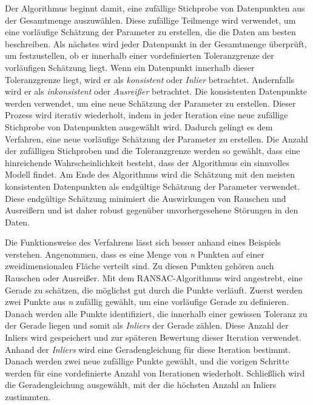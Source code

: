 Der Algorithmus beginnt damit, eine zufällige Stichprobe von Datenpunkten aus der Gesamtmenge auszuwählen. Diese zufällige Teilmenge wird verwendet, um eine vorläufige Schätzung der Parameter zu erstellen, die die Daten am besten beschreiben. Als nächstes wird jeder Datenpunkt in der Gesamtmenge überprüft, um festzustellen, ob er innerhalb einer vordefinierten Toleranzgrenze der vorläufigen Schätzung liegt. Wenn ein Datenpunkt innerhalb dieser Toleranzgrenze liegt, wird er als \textit{konsistent} oder \textit{Inlier} betrachtet. Andernfalls wird er als \textit{inkonsistent} oder \textit{Ausreißer} betrachtet. Die konsistenten Datenpunkte werden verwendet, um eine neue Schätzung der Parameter zu erstellen. Dieser Prozess wird iterativ wiederholt, indem in jeder Iteration eine neue zufällige Stichprobe von Datenpunkten ausgewählt wird. Dadurch gelingt es dem Verfahren, eine neue vorläufige Schätzung der Parameter zu erstellen. Die Anzahl der zufälligen Stichproben und die Toleranzgrenze werden so gewählt, dass eine hinreichende Wahrscheinlichkeit besteht, dass der Algorithmus ein sinnvolles Modell findet. Am Ende des Algorithmus wird die Schätzung mit den meisten konsistenten Datenpunkten als endgültige Schätzung der Parameter verwendet. Diese endgültige Schätzung minimiert die Auswirkungen von Rauschen und Ausreißern und ist daher robust gegenüber unvorhergesehene Störungen in den Daten. \autocite[383-384]{fischler_random_1981} \autocite[3]{martinez-otzeta_ransac_2023}

Die Funktionsweise des Verfahrens lässt sich besser anhand eines Beispiels verstehen. Angenommen, dass es eine Menge von \textit{n} Punkten auf einer zweidimensionalen Fläche verteilt sind. Zu diesen Punkten gehören auch Rauschen oder Ausreißer. Mit dem RANSAC-Algorithmus wird angestrebt, eine Gerade zu schätzen, die möglichst gut durch die Punkte verläuft. Zuerst werden zwei Punkte aus \textit{n} zufällig gewählt, um eine vorläufige Gerade zu definieren. Danach werden alle Punkte identifiziert, die innerhalb einer gewissen Toleranz zu der Gerade liegen und somit als \textit{Inliers} der Gerade zählen. Diese Anzahl der Inliers wird gespeichert und zur späteren Bewertung dieser Iteration verwendet. Anhand der \textit{Inliers} wird eine Geradengleichung für diese Iteration bestimmt. Danach werden zwei neue zufällige Punkte gewählt, und die vorigen Schritte werden für eine vordefinierte Anzahl von Iterationen wiederholt. Schließlich wird die Geradengleichung ausgewählt, mit der die höchsten Anzahl an Inliers zustimmten. 

